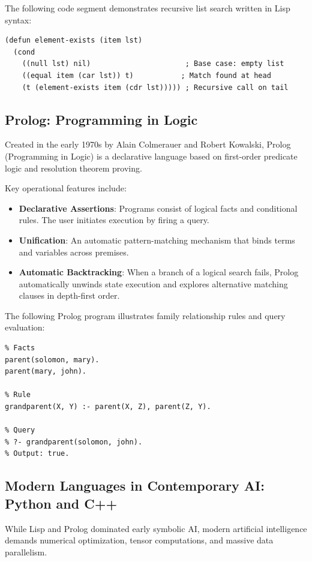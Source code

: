\documentclass[12pt]{report}
\begin{document}
The following code segment demonstrates recursive list search written in Lisp syntax:

\begin{verbatim}
(defun element-exists (item lst)
  (cond
    ((null lst) nil)                      ; Base case: empty list
    ((equal item (car lst)) t)           ; Match found at head
    (t (element-exists item (cdr lst))))) ; Recursive call on tail
\end{verbatim}

\subsection{Prolog: Programming in Logic}

Created in the early 1970s by Alain Colmerauer and Robert Kowalski, Prolog (Programming in Logic) is a declarative language based on first-order predicate logic and resolution theorem proving.

Key operational features include:

\begin{itemize}
    \item \textbf{Declarative Assertions}: Programs consist of logical facts and conditional rules. The user initiates execution by firing a query.
    \item \textbf{Unification}: An automatic pattern-matching mechanism that binds terms and variables across premises.
    \item \textbf{Automatic Backtracking}: When a branch of a logical search fails, Prolog automatically unwinds state execution and explores alternative matching clauses in depth-first order.
\end{itemize}

The following Prolog program illustrates family relationship rules and query evaluation:

\begin{verbatim}
% Facts
parent(solomon, mary).
parent(mary, john).

% Rule
grandparent(X, Y) :- parent(X, Z), parent(Z, Y).

% Query
% ?- grandparent(solomon, john).
% Output: true.
\end{verbatim}

\subsection{Modern Languages in Contemporary AI: Python and C++}

While Lisp and Prolog dominated early symbolic AI, modern artificial intelligence demands numerical optimization, tensor computations, and massive data parallelism.
\end{document}
